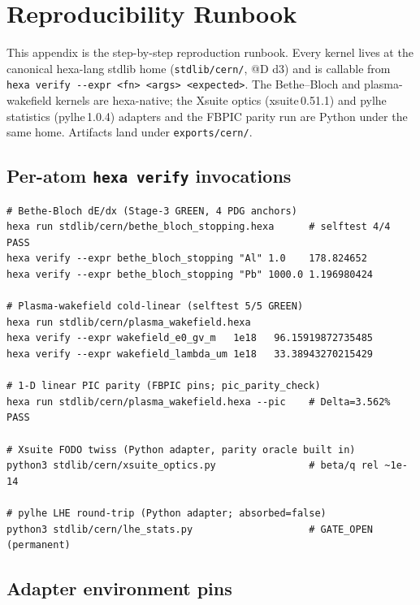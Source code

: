 \section{Reproducibility Runbook}
\label{app:repro}

This appendix is the step-by-step reproduction runbook. Every kernel
lives at the canonical hexa-lang stdlib home (\verb|stdlib/cern/|, @D d3)
and is callable from \verb|hexa verify --expr <fn> <args> <expected>|.
The Bethe--Bloch and plasma-wakefield kernels are hexa-native; the Xsuite
optics (xsuite\,0.51.1) and pylhe statistics (pylhe\,1.0.4) adapters and
the FBPIC parity run are Python under the same home. Artifacts land under
\verb|exports/cern/|.

\subsection{Per-atom \texttt{hexa verify} invocations}
\label{app:repro-verify}

\begin{lstlisting}
# Bethe-Bloch dE/dx (Stage-3 GREEN, 4 PDG anchors)
hexa run stdlib/cern/bethe_bloch_stopping.hexa      # selftest 4/4 PASS
hexa verify --expr bethe_bloch_stopping "Al" 1.0    178.824652
hexa verify --expr bethe_bloch_stopping "Pb" 1000.0 1.196980424

# Plasma-wakefield cold-linear (selftest 5/5 GREEN)
hexa run stdlib/cern/plasma_wakefield.hexa
hexa verify --expr wakefield_e0_gv_m   1e18   96.15919872735485
hexa verify --expr wakefield_lambda_um 1e18   33.38943270215429

# 1-D linear PIC parity (FBPIC pins; pic_parity_check)
hexa run stdlib/cern/plasma_wakefield.hexa --pic    # Delta=3.562% PASS

# Xsuite FODO twiss (Python adapter, parity oracle built in)
python3 stdlib/cern/xsuite_optics.py                # beta/q rel ~1e-14

# pylhe LHE round-trip (Python adapter; absorbed=false)
python3 stdlib/cern/lhe_stats.py                    # GATE_OPEN (permanent)
\end{lstlisting}

\subsection{Adapter environment pins}
\label{app:repro-env}

